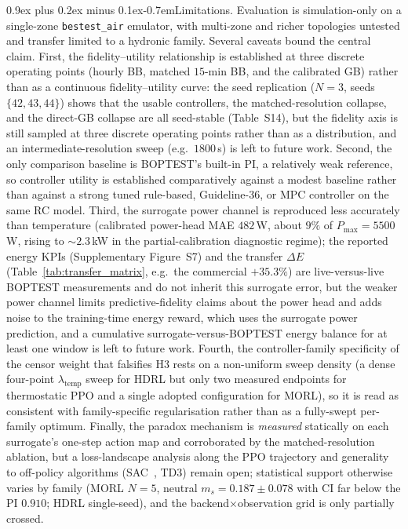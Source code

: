 \documentclass[a4paper,fleqn]{cas-sc}
\makeatletter
\renewcommand\paragraph{\@startsection{paragraph}{4}{\z@}%
 {0.9ex plus 0.2ex minus 0.1ex}{-0.7em}{\normalfont\normalsize\bfseries}}
\newcommand{\suppref}[1]{#1}
\makeatother
\begin{document}
\paragraph{Limitations.}\label{ssec:block1-limitations}\label{ssec:b3lim}
Evaluation is simulation-only on a single-zone \texttt{bestest\_air} emulator, with multi-zone and richer topologies untested and transfer limited to a hydronic family. Several caveats bound the central claim. First, the fidelity--utility relationship is established at three discrete operating points (hourly BB, matched $15$-min BB, and the calibrated GB) rather than as a continuous fidelity--utility curve: the seed replication ($N=3$, seeds $\{42,43,44\}$) shows that the usable controllers, the matched-resolution collapse, and the direct-GB collapse are all seed-stable (Table~\suppref{S14}), but the fidelity axis is still sampled at three discrete operating points rather than as a distribution, and an intermediate-resolution sweep (e.g.\ $1800$\,s) is left to future work. Second, the only comparison baseline is BOPTEST's built-in PI, a relatively weak reference, so controller utility is established comparatively against a modest baseline rather than against a strong tuned rule-based, Guideline-36, or MPC controller on the same RC model. Third, the surrogate power channel is reproduced less accurately than temperature (calibrated power-head MAE $482$\,W, about $9\%$ of $P_{\max}=5500$\,W, rising to ${\sim}2.3$\,kW in the partial-calibration diagnostic regime); the reported energy KPIs (Supplementary Figure~\suppref{S7}) and the transfer $\Delta E$ (Table~\ref{tab:transfer_matrix}, e.g.\ the commercial $+35.3\%$) are live-versus-live BOPTEST measurements and do not inherit this surrogate error, but the weaker power channel limits predictive-fidelity claims about the power head and adds noise to the training-time energy reward, which uses the surrogate power prediction, and a cumulative surrogate-versus-BOPTEST energy balance for at least one window is left to future work. Fourth, the controller-family specificity of the censor weight that falsifies H3 rests on a non-uniform sweep density (a dense four-point $\lambda_{\mathrm{temp}}$ sweep for HDRL but only two measured endpoints for thermostatic PPO and a single adopted configuration for MORL), so it is read as consistent with family-specific regularisation rather than as a fully-swept per-family optimum. Finally, the paradox mechanism is \emph{measured} statically on each surrogate's one-step action map and corroborated by the matched-resolution ablation, but a loss-landscape analysis along the PPO trajectory and generality to off-policy algorithms (SAC~\citep{Haarnoja2018SAC}, TD3) remain open; statistical support otherwise varies by family (MORL $N=5$, neutral $m_s=0.187\pm0.078$ with CI far below the PI $0.910$; HDRL single-seed), and the backend$\times$observation grid is only partially crossed.
\end{document}
